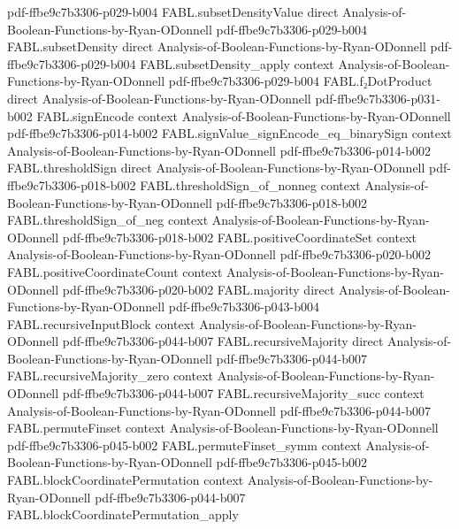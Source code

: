 \begin{theorem}
  {pdf-ffbe9c7b3306-p029-b004}
\proofstep
  {FABL.subsetDensityValue}
  {direct}
  {Analysis-of-Boolean-Functions-by-Ryan-ODonnell}
  {pdf-ffbe9c7b3306-p029-b004}
\proofstep
  {FABL.subsetDensity}
  {direct}
  {Analysis-of-Boolean-Functions-by-Ryan-ODonnell}
  {pdf-ffbe9c7b3306-p029-b004}
\proofstep
  {FABL.subsetDensity_apply}
  {context}
  {Analysis-of-Boolean-Functions-by-Ryan-ODonnell}
  {pdf-ffbe9c7b3306-p029-b004}
\proofstep
  {FABL.f₂DotProduct}
  {direct}
  {Analysis-of-Boolean-Functions-by-Ryan-ODonnell}
  {pdf-ffbe9c7b3306-p031-b002}
\proofstep
  {FABL.signEncode}
  {context}
  {Analysis-of-Boolean-Functions-by-Ryan-ODonnell}
  {pdf-ffbe9c7b3306-p014-b002}
\proofstep
  {FABL.signValue_signEncode_eq_binarySign}
  {context}
  {Analysis-of-Boolean-Functions-by-Ryan-ODonnell}
  {pdf-ffbe9c7b3306-p014-b002}
\proofstep
  {FABL.thresholdSign}
  {direct}
  {Analysis-of-Boolean-Functions-by-Ryan-ODonnell}
  {pdf-ffbe9c7b3306-p018-b002}
\proofstep
  {FABL.thresholdSign_of_nonneg}
  {context}
  {Analysis-of-Boolean-Functions-by-Ryan-ODonnell}
  {pdf-ffbe9c7b3306-p018-b002}
\proofstep
  {FABL.thresholdSign_of_neg}
  {context}
  {Analysis-of-Boolean-Functions-by-Ryan-ODonnell}
  {pdf-ffbe9c7b3306-p018-b002}
\proofstep
  {FABL.positiveCoordinateSet}
  {context}
  {Analysis-of-Boolean-Functions-by-Ryan-ODonnell}
  {pdf-ffbe9c7b3306-p020-b002}
\proofstep
  {FABL.positiveCoordinateCount}
  {context}
  {Analysis-of-Boolean-Functions-by-Ryan-ODonnell}
  {pdf-ffbe9c7b3306-p020-b002}
\proofstep
  {FABL.majority}
  {direct}
  {Analysis-of-Boolean-Functions-by-Ryan-ODonnell}
  {pdf-ffbe9c7b3306-p043-b004}
\proofstep
  {FABL.recursiveInputBlock}
  {context}
  {Analysis-of-Boolean-Functions-by-Ryan-ODonnell}
  {pdf-ffbe9c7b3306-p044-b007}
\proofstep
  {FABL.recursiveMajority}
  {direct}
  {Analysis-of-Boolean-Functions-by-Ryan-ODonnell}
  {pdf-ffbe9c7b3306-p044-b007}
\proofstep
  {FABL.recursiveMajority_zero}
  {context}
  {Analysis-of-Boolean-Functions-by-Ryan-ODonnell}
  {pdf-ffbe9c7b3306-p044-b007}
\proofstep
  {FABL.recursiveMajority_succ}
  {context}
  {Analysis-of-Boolean-Functions-by-Ryan-ODonnell}
  {pdf-ffbe9c7b3306-p044-b007}
\proofstep
  {FABL.permuteFinset}
  {context}
  {Analysis-of-Boolean-Functions-by-Ryan-ODonnell}
  {pdf-ffbe9c7b3306-p045-b002}
\proofstep
  {FABL.permuteFinset_symm}
  {context}
  {Analysis-of-Boolean-Functions-by-Ryan-ODonnell}
  {pdf-ffbe9c7b3306-p045-b002}
\proofstep
  {FABL.blockCoordinatePermutation}
  {context}
  {Analysis-of-Boolean-Functions-by-Ryan-ODonnell}
  {pdf-ffbe9c7b3306-p044-b007}
\proofstep
  {FABL.blockCoordinatePermutation_apply}

\end{theorem}
